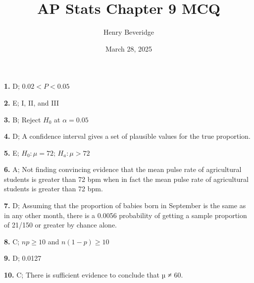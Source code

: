 \documentclass{article}
\title{AP Stats Chapter 9 MCQ}
\author{Henry Beveridge}
\date{March 28, 2025}
\begin{document}
\maketitle

\textbf{1.} D; $0.02<P<0.05$

\textbf{2.} E; I, II, and III

\textbf{3.} B; Reject $H_0$ at $\alpha=0.05$

\textbf{4.} D; A confidence interval gives a set of plausible values for the true proportion.

\textbf{5.} E; $H_0:\mu=72$; $H_a: \mu > 72$ 

\textbf{6.} A; Not finding convincing evidence that the mean pulse rate of agricultural students is greater than 72 bpm when in fact the mean pulse rate of agricultural students is greater than 72 bpm.

\textbf{7.} D; Assuming that the proportion of babies born in September is the same as in any other month, there is a 0.0056 probability of getting a sample proportion of 21/150 or greater by chance alone.

\textbf{8.} C; $np\ge10$ and $n(1-p)\ge10$

\textbf{9.} D; 0.0127

\textbf{10.} C; There is sufficient evidence to conclude that µ ≠ 60.
\end{document}
